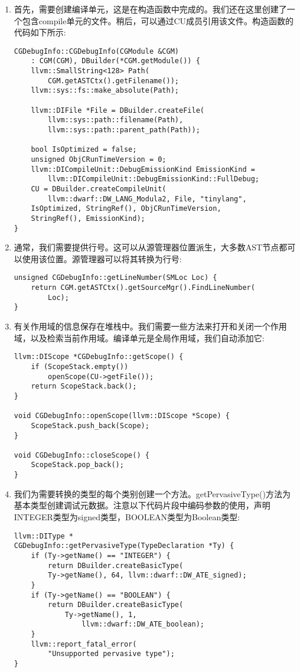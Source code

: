 \begin{enumerate}
\item 首先，需要创建编译单元，这是在构造函数中完成的。我们还在这里创建了一个包含compile单元的文件。稍后，可以通过CU成员引用该文件。构造函数的代码如下所示:
\begin{lstlisting}[caption={}]
CGDebugInfo::CGDebugInfo(CGModule &CGM)
	: CGM(CGM), DBuilder(*CGM.getModule()) {
	llvm::SmallString<128> Path(
		CGM.getASTCtx().getFilename());
	llvm::sys::fs::make_absolute(Path);
	
	llvm::DIFile *File = DBuilder.createFile(
		llvm::sys::path::filename(Path),
		llvm::sys::path::parent_path(Path));
		
	bool IsOptimized = false;
	unsigned ObjCRunTimeVersion = 0;
	llvm::DICompileUnit::DebugEmissionKind EmissionKind =
		llvm::DICompileUnit::DebugEmissionKind::FullDebug;
	CU = DBuilder.createCompileUnit(
		llvm::dwarf::DW_LANG_Modula2, File, "tinylang",
	IsOptimized, StringRef(), ObjCRunTimeVersion,
	StringRef(), EmissionKind);
}
\end{lstlisting}

\item 通常，我们需要提供行号。这可以从源管理器位置派生，大多数AST节点都可以使用该位置。源管理器可以将其转换为行号:
\begin{lstlisting}[caption={}]
unsigned CGDebugInfo::getLineNumber(SMLoc Loc) {
	return CGM.getASTCtx().getSourceMgr().FindLineNumber(
		Loc);
}
\end{lstlisting}

\item 有关作用域的信息保存在堆栈中。我们需要一些方法来打开和关闭一个作用域，以及检索当前作用域。编译单元是全局作用域，我们自动添加它:
\begin{lstlisting}[caption={}]
llvm::DIScope *CGDebugInfo::getScope() {
	if (ScopeStack.empty())
		openScope(CU->getFile());
	return ScopeStack.back();
}

void CGDebugInfo::openScope(llvm::DIScope *Scope) {
	ScopeStack.push_back(Scope);
}

void CGDebugInfo::closeScope() {
	ScopeStack.pop_back();
}
\end{lstlisting}

\item 我们为需要转换的类型的每个类别创建一个方法。getPervasiveType()方法为基本类型创建调试元数据。注意以下代码片段中编码参数的使用，声明INTEGER类型为signed类型，BOOLEAN类型为Boolean类型:
\begin{lstlisting}[caption={}]
llvm::DIType *
CGDebugInfo::getPervasiveType(TypeDeclaration *Ty) {
	if (Ty->getName() == "INTEGER") {
		return DBuilder.createBasicType(
		Ty->getName(), 64, llvm::dwarf::DW_ATE_signed);
	}
	if (Ty->getName() == "BOOLEAN") {
		return DBuilder.createBasicType(
			Ty->getName(), 1, 
				llvm::dwarf::DW_ATE_boolean);
	}
	llvm::report_fatal_error(
		"Unsupported pervasive type");
}
\end{lstlisting}


\end{enumerate}
